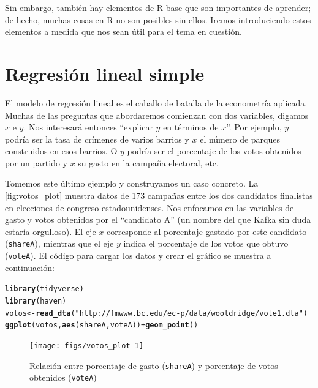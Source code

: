 \documentclass[12pt]{report}\usepackage[]{graphicx}\usepackage[]{color}
\makeatletter
\newcommand{\hlstr}[1]{\textcolor[rgb]{0.192,0.494,0.8}{#1}}%
\newcommand{\hlopt}[1]{\textcolor[rgb]{0,0,0}{#1}}%
\newcommand{\hlstd}[1]{\textcolor[rgb]{0.345,0.345,0.345}{#1}}%
\newcommand{\hlkwb}[1]{\textcolor[rgb]{0.69,0.353,0.396}{#1}}%
\newcommand{\hlkwd}[1]{\textcolor[rgb]{0.737,0.353,0.396}{\textbf{#1}}}%
\newenvironment{kframe}{%
 \def\at@end@of@kframe{}%
 \ifinner\ifhmode%
  \def\at@end@of@kframe{\end{minipage}}%
  \begin{minipage}{\columnwidth}%
 \fi\fi%
 \def\FrameCommand##1{\hskip\@totalleftmargin \hskip-\fboxsep
 \colorbox{shadecolor}{##1}\hskip-\fboxsep
     \hskip-\linewidth \hskip-\@totalleftmargin \hskip\columnwidth}%
 \MakeFramed {\advance\hsize-\width
   \@totalleftmargin\z@ \linewidth\hsize
   \@setminipage}}%
 {\par\unskip\endMakeFramed%
 \at@end@of@kframe}
\newenvironment{knitrout}{}{} %
\makeatother
\begin{document}
Sin embargo, también hay elementos de R base que son importantes de aprender; de hecho, muchas cosas en R no son posibles sin ellos. Iremos introduciendo estos elementos a medida que nos sean útil para el tema en cuestión.




\chapter{Regresión lineal simple}



El modelo de regresión lineal es el caballo de batalla de la econometría aplicada.
Muchas de las preguntas que abordaremos comienzan con dos variables, digamos $x$ e $y$. Nos interesará entonces ``explicar $y$ en términos de $x$''.
Por ejemplo, $y$ podría ser la tasa de crímenes de varios barrios y $x$ el número de parques construidos en esos barrios.
O $y$ podría ser el porcentaje de los votos obtenidos por un partido y $x$ su gasto en la campaña electoral, etc.

Tomemos este último ejemplo y construyamos un caso concreto.
La \autoref{fig:votos_plot} muestra datos de 173 campañas entre los dos candidatos finalistas en elecciones de congreso estadounidenses.
Nos enfocamos en las variables de gasto y votos obtenidos por el ``candidato A'' (un nombre del que Kafka sin duda estaría orgulloso).
El eje $x$ corresponde al porcentaje gastado por este candidato (\verb|shareA|), mientras que el eje $y$ indica el porcentaje de los votos que obtuvo (\verb|voteA|).
El código para cargar los datos y crear el gráfico se muestra a continuación:

\begin{knitrout}
\color{fgcolor}\begin{kframe}
\begin{alltt}
\hlkwd{library}\hlstd{(tidyverse)}
\hlkwd{library}\hlstd{(haven)}
\hlstd{votos} \hlkwb{<-} \hlkwd{read_dta}\hlstd{(}\hlstr{"http://fmwww.bc.edu/ec-p/data/wooldridge/vote1.dta"}\hlstd{)}
\hlkwd{ggplot}\hlstd{(votos,} \hlkwd{aes}\hlstd{(shareA, voteA))} \hlopt{+} \hlkwd{geom_point}\hlstd{()}
\end{alltt}
\end{kframe}\begin{figure}[htb]

{\centering \texttt{[image: figs/votos\_plot-1]} 

}

\caption[Relación entre porcentaje de gasto (\texttt{shareA}) y porcentaje de votos obtenidos (\texttt{voteA})]{Relación entre porcentaje de gasto (\texttt{shareA}) y porcentaje de votos obtenidos (\texttt{voteA})}\label{fig:votos_plot}
\end{figure}


\end{knitrout}
\end{document}
